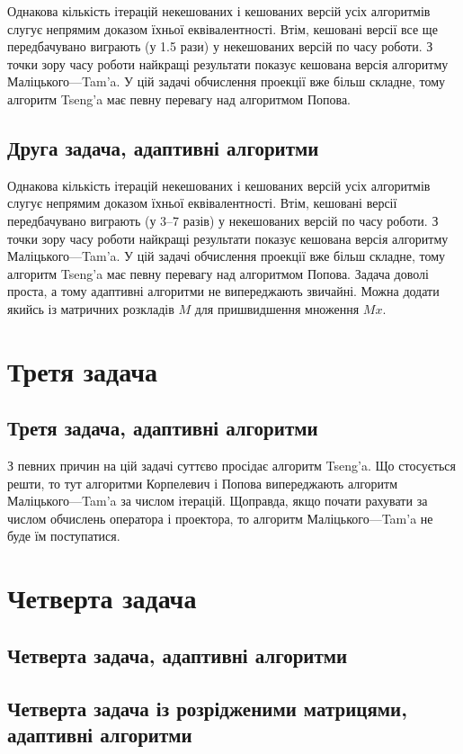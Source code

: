 

Однакова кількість ітерацій некешованих і кешованих версій усіх алгоритмів слугує непрямим доказом їхньої еквівалентності. Втім, кешовані версії все ще передбачувано виграють (у 1.5 рази) у некешованих версій по часу роботи. З точки зору часу роботи найкращі результати показує кешована версія алгоритму Маліцького---Tam'a. У цій задачі обчислення проекції вже більш складне, %
тому алгоритм Tseng'a має певну перевагу над алгоритмом Попова. 

\newpage\subsection{Друга задача, адаптивні алгоритми}



Однакова кількість ітерацій некешованих і кешованих версій усіх алгоритмів слугує непрямим доказом їхньої еквівалентності. Втім, кешовані версії передбачувано виграють (у 3--7 разів) у некешованих версій по часу роботи. З точки зору часу роботи найкращі результати показує кешована версія алгоритму Маліцького---Tam'a. У цій задачі обчислення проекції вже більш складне, %
тому алгоритм Tseng'a має певну перевагу над алгоритмом Попова. Задача доволі проста, а тому адаптивні алгоритми не випереджають звичайні. Можна додати якийсь із матричних розкладів $M$ для пришвидшення множення $M x$.

\section{Третя задача}

\subsection{Третя задача, адаптивні алгоритми}



З певних причин на цій задачі суттєво просідає алгоритм Tseng'a. Що стосується решти, то тут алгоритми Корпелевич і Попова випереджають алгоритм Маліцького---Tam'a за числом ітерацій. Щоправда, якщо почати рахувати за числом обчислень оператора і проектора, то  алгоритм Маліцького---Tam'a не буде їм поступатися.

\section{Четверта задача}

\subsection{Четверта задача, адаптивні алгоритми}



\newpage\subsection{Четверта задача із розрідженими матрицями, адаптивні алгоритми}


